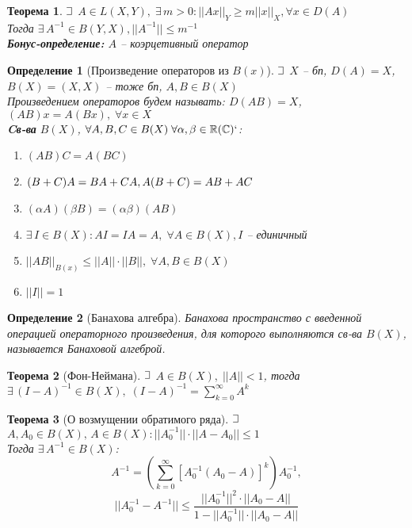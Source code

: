 \documentclass{article}
\theoremstyle{truestyle}
\newtheorem*{defenition}{Определение}
\newtheorem*{theorem}{Теорема}
\def\letus{%
	\mathord{\setbox0=\hbox{$\exists$}%
		\hbox{\kern 0.125\wd0%
			\vbox to \ht0{%
				\hrule width 0.75\wd0%
				\vfill%
				\hrule width 0.75\wd0}%
			\vrule height \ht0%
			\kern 0.125\wd0}%
	}%
}
\begin{document}
\begin{theorem}
  $\letus$ $A \in L(X, Y), \; \exists \, m > 0: ||Ax||_Y \ge m||x||_X, \forall x \in D(A)$\\
  Тогда $\exists \, A^{-1} \in B(Y, X), ||A^{-1}|| \le m^{-1}$\\
  {\bf Бонус-определение:} $A$ -- коэрцетивный оператор
\end{theorem}

\begin{defenition}[Произведение операторов из  $B(x)$]
  $\letus$ $X$ -- бп, $D(A) = X$, $B(X) = (X, X)$ -- тоже бп, $A, B \in B(X)$\\
  Произведением операторов будем называть: $D(AB) = X$, $(AB)x = A(Bx), \; \forall x \in X$\\
  {\bf Cв-ва} $B(X)$, $\forall A, B, C \in B(X) \; \forall \alpha, \beta \in  \mathbb{R}(\mathbb{C})`$:
  \begin{enumerate}
    \item $(AB)C = A(BC)$
    \item $(B+C)A = BA+CA, \; \\ A(B+C) = AB+AC$
    \item $(\alpha A)(\beta B) = (\alpha\beta)(AB)$
    \item $\exists \, I \in B(X): AI = IA = A, \; \forall A \in B(X), I$ -- единичный
    \item $||AB||_{B(x)} \le ||A|| \cdot ||B||, \; \forall A, B \in B(X)$
    \item $||I|| = 1$
  \end{enumerate}
\end{defenition}

\begin{defenition}[Банахова алгебра]
  Банахова пространство с введенной операцией операторного произведения, для которого выполняются св-ва $B(X)$, называется 
  Банаховой алгеброй.
\end{defenition}


\begin{theorem}[Фон-Неймана]
  $\letus$ $A \in B(X), \; ||A|| < 1$, тогда $\exists \, (I - A)^{-1} \in B(X), \; (I - A)^{-1} = \sum\limits_{k=0}^{\infty} A^k$
\end{theorem}

\begin{theorem}[О возмущении обратимого ряда]
  $\letus$ $A, A_0 \in B(X), \, A \in B(X): ||A_0^{-1}|| \cdot ||A - A_0|| \le 1$\\
  Тогда $\exists \, A^{-1} \in B(X)$:
  $$ A^{-1} = \left(\sum\limits_{k=0}^{\infty}[A_0^{-1}(A_0 - A)]^k\right)A_0^{-1},$$ 
  $$||A_0^{-1} - A^{-1}|| \le \frac{||A_0^{-1}||^2 \cdot ||A_0 - A||}{1 - ||A_0^{-1}|| \cdot ||A_0 - A||}$$
\end{theorem}
\end{document}
